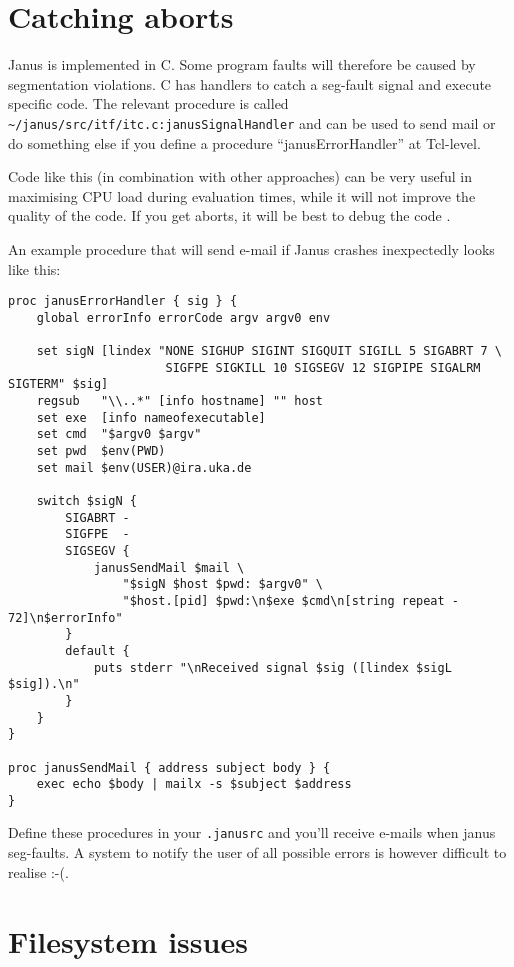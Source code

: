 \section{Catching aborts} \label{trouble:abort}

Janus  is implemented  in C.   Some program  faults will  therefore be
caused by segmentation violations. C has handlers to catch a seg-fault
signal and  execute specific code.  The   relevant procedure is called
\texttt{\~{ }/janus/src/itf/itc.c:janusSignalHandler} and can be used
to send  mail  or do   something  else if    you  define a   procedure
``janusErrorHandler'' at Tcl-level.

Code like   this (in combination with  other  approaches)  can be very
useful in  maximising CPU load  during evaluation times, while it will
not improve the quality of  the code. If  you get  aborts, it will  be
best to debug the code .

An example procedure that will send e-mail if Janus crashes inexpectedly
looks like this:

\begin{verbatim}
proc janusErrorHandler { sig } {
    global errorInfo errorCode argv argv0 env

    set sigN [lindex "NONE SIGHUP SIGINT SIGQUIT SIGILL 5 SIGABRT 7 \
                      SIGFPE SIGKILL 10 SIGSEGV 12 SIGPIPE SIGALRM SIGTERM" $sig]
    regsub   "\\..*" [info hostname] "" host
    set exe  [info nameofexecutable]
    set cmd  "$argv0 $argv"
    set pwd  $env(PWD)
    set mail $env(USER)@ira.uka.de

    switch $sigN {
        SIGABRT -
        SIGFPE  -
        SIGSEGV {
            janusSendMail $mail \
                "$sigN $host $pwd: $argv0" \
                "$host.[pid] $pwd:\n$exe $cmd\n[string repeat - 72]\n$errorInfo"
        }
        default {
            puts stderr "\nReceived signal $sig ([lindex $sigL $sig]).\n"
        }
    }
}

proc janusSendMail { address subject body } {
    exec echo $body | mailx -s $subject $address
}
\end{verbatim}

Define these procedures in your \texttt{.janusrc} and you'll receive
e-mails when janus seg-faults. A system to notify the user of all
possible errors is however difficult to realise :-(.


\section{Filesystem issues} \label{trouble:filesys}

